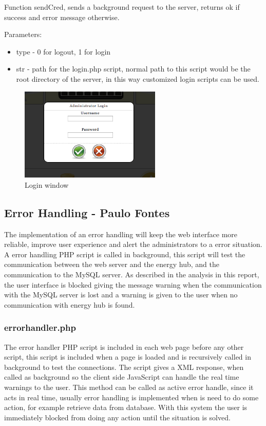 Function sendCred, sends a background request to the server, returns ok if success and error message otherwise. 

Parameters:
\begin{itemize}
	\item type - 0 for logout, 1 for login
	\item str - path for the login.php script, normal path to this script would be the root directory of the server, in this way customized login scripts can be used.
\end{itemize}

\begin{figure}[H]
		\begin{centering}
			\includegraphics[width=0.6\textwidth]{images/login.png}
			\caption{Login window}
		\end{centering}
\end{figure}

\subsection{Error Handling - Paulo Fontes}
The implementation of an error handling will keep the web interface more reliable, improve user experience and alert the administrators to a error situation. A error handling PHP script is called in background, this script will test the communication between the web server and the energy hub, and the communication to the MySQL server. As described in the analysis in this report, the user interface is blocked giving the message warning when the communication with the MySQL server is lost and a warning is given to the user when no communication with energy hub is found.

\subsubsection{errorhandler.php} The error handler PHP script is included in each web page before any other script, this script is included when a page is loaded and is recursively called in background to test the connections. The script gives a XML response, when called as background so the client side JavaScript can handle the real time warnings to the user. This method can be called as active error handle, since it acts in real time, usually error handling is implemented when is need to do some action, for example retrieve data from database. With this system the user is immediately blocked from doing any action until the situation is solved.

